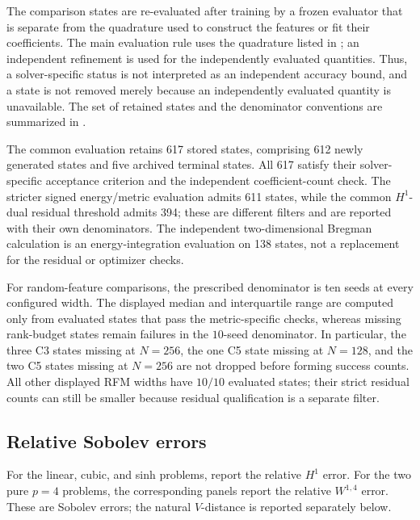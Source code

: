 The comparison states are re-evaluated after training by a frozen evaluator that is separate from
the quadrature used to construct the features or fit their coefficients.  The main evaluation rule
uses the quadrature listed in ; an independent refinement is used for the independently evaluated quantities.  Thus, a solver-specific status is not interpreted as an independent accuracy bound, and a state is not removed merely because an independently evaluated quantity is unavailable.  The
set of retained states and the denominator conventions are summarized in
.

The common evaluation retains 617 stored states, comprising 612 newly generated states and five archived
terminal states.  All 617 satisfy their solver-specific acceptance criterion and the independent coefficient-count
check.  The stricter signed energy/metric evaluation admits 611 states, while the common \(H^1\)-dual
residual threshold admits 394; these are different filters and are reported with their own
denominators.  The independent two-dimensional Bregman calculation is an energy-integration evaluation
on 138 states, not a replacement for the residual or optimizer checks.

For random-feature comparisons, the prescribed denominator is ten seeds at every configured width.
The displayed median and interquartile range are computed only from evaluated states that pass the
metric-specific checks, whereas missing rank-budget states remain failures in the \(10\)-seed
denominator.  In particular, the three C3 states missing at \(N=256\), the one C5 state missing at
\(N=128\), and the two C5 states missing at \(N=256\) are not dropped before forming success counts.
All other displayed RFM widths have \(10/10\) evaluated states; their strict residual counts can
still be smaller because residual qualification is a separate filter.


\FloatBarrier

\subsection{Relative Sobolev errors}

For the linear, cubic, and sinh problems,
 report the relative \(H^1\) error. For the
two pure \(p=4\) problems, the corresponding panels report the relative
\(W^{1,4}\) error. These are Sobolev errors; the natural \(V\)-distance is reported separately below.

